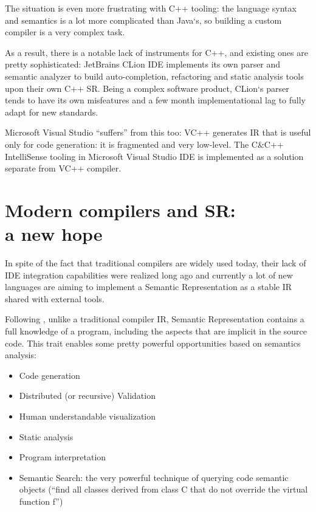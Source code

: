 The situation is even more frustrating with C++ tooling: the language syntax
and semantics is a lot more complicated than Java`s, so building a custom
compiler is a very complex task.

As a result, there is a notable lack of instruments for C++\cite{Zouev2010}, and existing
ones are pretty sophisticated: JetBrains CLion IDE implements its own parser
and semantic analyzer to build auto-completion, refactoring and static analysis
tools upon their own C++ SR. Being a complex software product, CLion`s parser
tends to have its own misfeatures and a few month implementational lag to
fully adapt for new standards.


Microsoft Visual Studio “suffers” from this too: VC++ generates IR that is useful
only for code generation: it is fragmented and very low-level.
The C\&C++ IntelliSense tooling in Microsoft Visual Studio IDE is implemented
as a solution separate from VC++ compiler.

\section{Modern compilers and SR: \\a new hope}
\label{sec:review_2}

In spite of the fact that traditional compilers are widely used today, their lack of
IDE integration capabilities were realized long ago and currently a lot of new
languages are aiming to implement a Semantic Representation as a stable IR
shared with external tools.

Following \cite{Zouev2005, Zouev2010}, unlike a traditional compiler IR, Semantic Representation contains a full
knowledge of a program, including the aspects that are implicit in the source
code. This trait enables some pretty powerful opportunities based on
semantics analysis:

\begin{itemize}
    \item Code generation
    \item Distributed (or recursive) Validation
    \item Human understandable visualization
    \item Static analysis
    \item Program interpretation
    \item Semantic Search: the very powerful technique of querying code semantic objects (“find all classes derived from class C that do not override the virtual function f”)
\end{itemize}

